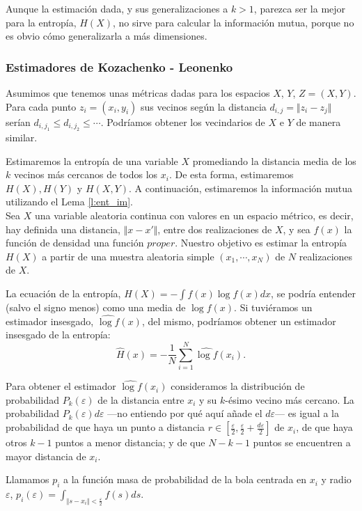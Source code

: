 \documentclass[10pt,a4paper]{article} %
\theoremstyle{definition}
\begin{document}
Aunque la estimación dada, y sus generalizaciones a $k>1$, parezca ser la mejor para la entropía, $H(X)$, no sirve para calcular la información mutua, porque no es obvio cómo generalizarla a más dimensiones.

\subsubsection{Estimadores de Kozachenko - Leonenko}

Asumimos que tenemos unas métricas dadas para los espacios $X$, $Y$, $Z = (X,Y)$. Para cada punto $z_i = (x_i, y_i)$ sus vecinos según la distancia $d_{i,j}=\Vert z_i-z_j \Vert$ serían $d_{i,j_1} \leq d_{i,j_2} \leq \cdots$. Podríamos obtener los vecindarios de $X$ e $Y$ de manera similar.

Estimaremos la entropía de una variable $X$ promediando la distancia media de los $k$ vecinos más cercanos de todos los $x_i$. De esta forma, estimaremos $H(X), H(Y)$ y $H(X,Y)$. A continuación, estimaremos la información mutua utilizando el Lema \ref{l:ent_im}.\\

Sea $X$ una variable aleatoria continua con valores en un espacio métrico, es decir, hay definida una distancia, $\Vert x - x'\Vert$, entre dos realizaciones de $X$, y sea $f(x)$ la función de densidad una función $proper$. Nuestro objetivo es estimar la entropía $H(X)$ a partir de una muestra aleatoria simple $(x_1,\cdots,x_N)$ de $N$ realizaciones de $X$.

La ecuación de la entropía, $H(X) = - \int f(x) \log f(x) dx$, se podría entender (salvo el signo menos) como una media de $\log f(x)$. Si tuviéramos un estimador insesgado, $\widehat{\log f}(x)$, del mismo, podríamos obtener un estimador insesgado de la entropía:\[
\widehat{H}(x) = - \frac{1}{N} \sum_{i=1}^N\widehat{\log f}(x_i).\]

Para obtener el estimador $\widehat{\log f}(x_i)$ consideramos la distribución de probabilidad $P_k(\varepsilon)$ de la distancia entre $x_i$ y su $k$-ésimo vecino más cercano. La probabilidad $P_k(\varepsilon)d\varepsilon$ ---no entiendo por qué aquí añade el $d\varepsilon$--- es igual a la probabilidad de que haya un punto a distancia $r\in \left[ \frac{\varepsilon}{2}, \frac{\varepsilon}{2} + \frac{d\varepsilon}{2} \right ]$ de $x_i$, de que haya otros $k-1$ puntos a menor distancia; y de que $N-k-1$ puntos se encuentren a mayor distancia de $x_i$.

Llamamos $p_i$ a la función masa de probabilidad  de la bola centrada en $x_i$ y radio $\varepsilon$, $p_i(\varepsilon) = \int_{\Vert s - x_i \Vert < \frac{\varepsilon}{2}}f(s)ds$. 
\end{document}
